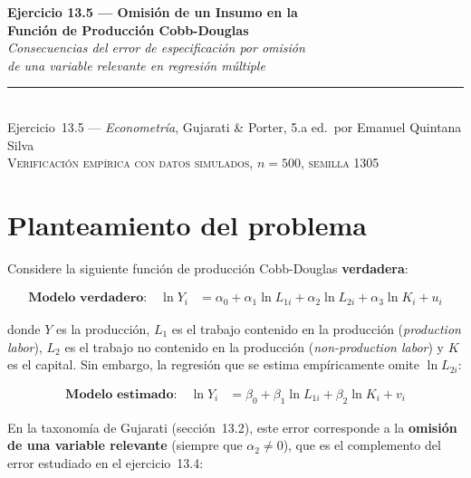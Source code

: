 \documentclass[12pt, letterpaper]{article}
\begin{document}

\begin{center}
  {\LARGE\bfseries Ejercicio 13.5 --- Omisión de un Insumo en la}\\[4pt]
  {\LARGE\bfseries Función de Producción Cobb-Douglas}\\[12pt]
  {\large\itshape Consecuencias del error de especificación por omisión}\\
  {\large\itshape de una variable relevante en regresión múltiple}\\[14pt]
  \rule{0.55\linewidth}{0.6pt}\\[8pt]
  {\normalsize Ejercicio~13.5 --- \textit{Econometría}, Gujarati \& Porter, 5.a ed.\
  por Emanuel Quintana Silva}\\[4pt]
  {\small\textsc{Verificación empírica con datos simulados, $n = 500$, semilla 1305}}
\end{center}

\vspace{10pt}

\section{Planteamiento del problema}

Considere la siguiente función de producción Cobb-Douglas \textbf{verdadera}:

\begin{align}
  \textbf{Modelo verdadero:} \quad
  \ln Y_i &= \alpha_0 + \alpha_1 \ln L_{1i} + \alpha_2 \ln L_{2i}
            + \alpha_3 \ln K_i + u_i \label{eq:verdadero}
\end{align}

donde $Y$ es la producción, $L_1$ es el trabajo contenido en la producción
(\textit{production labor}), $L_2$ es el trabajo no contenido en la producción
(\textit{non-production labor}) y $K$ es el capital. Sin embargo, la regresión
que se estima empíricamente omite $\ln L_{2i}$:

\begin{align}
  \textbf{Modelo estimado:} \quad
  \ln Y_i &= \beta_0 + \beta_1 \ln L_{1i} + \beta_2 \ln K_i + v_i
  \label{eq:corto}
\end{align}

En la taxonomía de Gujarati (sección~13.2), este error corresponde a la
\textbf{omisión de una variable relevante} (siempre que $\alpha_2 \neq 0$),
que es el complemento del error estudiado en el ejercicio~13.4:
\end{document}
